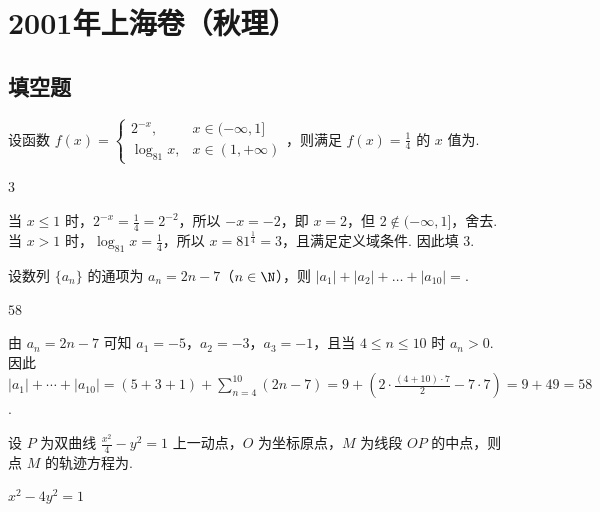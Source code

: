 
\chapter{2001年上海卷（秋理）}
\section{填空题}
\begin{problem}
设函数 \(f(x)=\begin{cases}
2^{-x},&x\in(-\infty,1]\\
\log_{81}x,&x\in(1,+\infty)
\end{cases}\)，则满足 \(f(x)=\frac14\) 的 \(x\) 值为\fillinblank{}.
\end{problem}

\begin{answer}
\(3\)
\end{answer}

\begin{solution}
当 \(x\leqslant1\) 时，\(2^{-x}=\frac14=2^{-2}\)，所以 \(-x=-2\)，即 \(x=2\)，但 \(2\notin(-\infty,1]\)，舍去. 当 \(x>1\) 时，\(\log_{81}x=\frac14\)，所以 \(x=81^{\frac{1}{4}}=3\)，且满足定义域条件. 因此填 \(3\).
\end{solution}

\begin{problem}
设数列 \(\{a_n\}\) 的通项为 \(a_n=2n-7\)（\(n\in\N\)），则 \(|a_1|+|a_2|+\dots+|a_{10}|=\)\fillinblank{}.
\end{problem}

\begin{answer}
\(58\)
\end{answer}

\begin{solution}
由 \(a_n=2n-7\) 可知 \(a_1=-5\)，\(a_2=-3\)，\(a_3=-1\)，且当 \(4\leqslant n\leqslant10\) 时 \(a_n>0\). 因此 \(|a_1|+\cdots+|a_{10}|=(5+3+1)+\sum_{n=4}^{10}(2n-7)=9+\left(2\cdot\frac{(4+10)\cdot7}{2}-7\cdot7\right)=9+49=58\).
\end{solution}

\begin{problem}
设 \(P\) 为双曲线 \(\frac{x^2}{4}-y^2=1\) 上一动点，\(O\) 为坐标原点，\(M\) 为线段 \(OP\) 的中点，则点 \(M\) 的轨迹方程为\fillinblank{}.
\end{problem}

\begin{answer}
\(x^2-4y^2=1\)
\end{answer}

